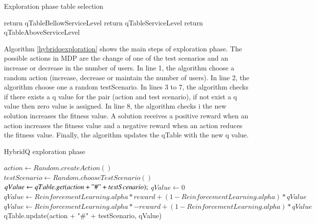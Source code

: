 \documentclass{report}
\begin{document}
\begin{algorithm}[h]
  \caption{Exploration phase table selection }\label{hybridqexploration}
  \begin{algorithmic}[1]
    \State return qTableBellowServiceLevel
    \EndIf
    \State return qTableServiceLevel
    \EndIf
    \State return qTableAboveServiceLevel
    \EndIf
  \end{algorithmic}
\end{algorithm}

Algorithm \ref{hybridqexploration} shows the main steps of exploration phase. The possible actions in MDP are the change of one of the test scenarios and an increase or decrease in the number of users. In line 1, the algorithm choose a random action (increase, decrease or maintain the number of users). In line 2, the algorithm choose one a random testScenario. In lines 3 to 7, the algorithm checks if there exists a q value  for the pair (action and test scenario), if not exist a q value then zero value is assigned. In line 8, the algorithm checks i the new solution increases the fitness value. A solution receives a positive reward when an action increases the fitness value and a negative reward when an action reduces the fitness value.  Finally, the algorithm updates the qTable with the new q value.


\begin{algorithm}[h]
  \caption{HybridQ exploration phase }\label{hybridqexploration}
  \begin{algorithmic}[1]
    \State $action \gets Random.createAction()$
    \State $testScenario \gets Random.chooseTestScenario()$
    \State $ qValue \gets qTable.get(action + "\#" + testScenario);$
    \Else
        \State $ qValue \gets 0$
    \EndIf
     \State $qValue \gets ReinforcementLearning.alpha * reward + (1 - ReinforcementLearning.alpha) * qValue$
     \Else
          \State $qValue \gets ReinforcementLearning.alpha * -reward + (1 - ReinforcementLearning.alpha) * qValue$
    \EndIf
    \State qTable.update(action + "\#" + testScenario, qValue)
  \end{algorithmic}
\end{algorithm}
\end{document}
